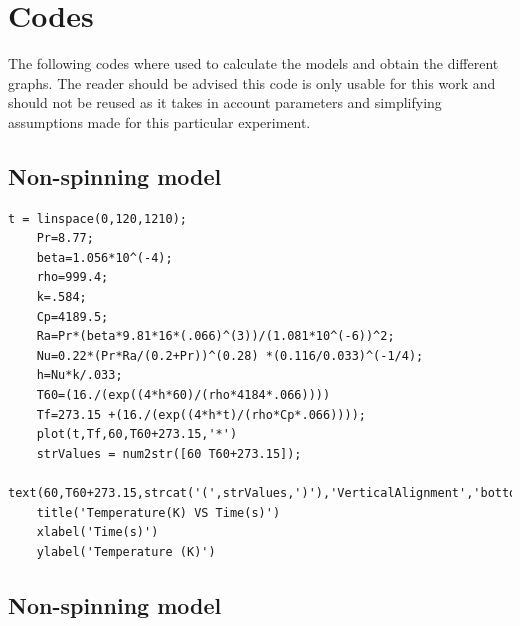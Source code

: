 \documentclass{report}
\begin{document}
	
	
	\chapter{Codes}
	
	The following codes where used to calculate the models and obtain the different graphs. The reader should be advised this code is only usable for this work and should not be reused as it takes in account parameters and simplifying assumptions made for this particular experiment.
	
	\section{Non-spinning model}\label{codeNS}
	
	\begin{lstlisting}[style=Matlab-editor]
	t = linspace(0,120,1210);
	Pr=8.77;
	beta=1.056*10^(-4);
	rho=999.4;
	k=.584;
	Cp=4189.5;
	Ra=Pr*(beta*9.81*16*(.066)^(3))/(1.081*10^(-6))^2;
	Nu=0.22*(Pr*Ra/(0.2+Pr))^(0.28) *(0.116/0.033)^(-1/4);
	h=Nu*k/.033;
	T60=(16./(exp((4*h*60)/(rho*4184*.066))))
	Tf=273.15 +(16./(exp((4*h*t)/(rho*Cp*.066))));
	plot(t,Tf,60,T60+273.15,'*')
	strValues = num2str([60 T60+273.15]);
	text(60,T60+273.15,strcat('(',strValues,')'),'VerticalAlignment','bottom');
	title('Temperature(K) VS Time(s)')
	xlabel('Time(s)')
	ylabel('Temperature (K)')
	\end{lstlisting}
	
	\section{Non-spinning model}\label{codeS}
	
\end{document}

